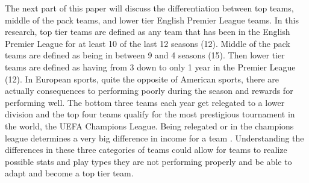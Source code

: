 \documentclass[12pt,english]{article}
\begin{document}
\begin{Introduction}
\begin{doublespace}
\indent The next part of this paper will discuss the differentiation between top teams, middle of the pack teams, and lower tier English Premier League teams. In this research, top tier teams are defined as any team that has been in the English Premier League for at least 10 of the last 12 seasons (12). Middle of the pack teams are defined as being in between 9 and 4 seasons (15). Then lower tier teams are defined as having from 3 down to only 1 year in the Premier League (12). In European sports, quite the opposite of American sports, there are actually consequences to performing poorly during the season and rewards for performing well. The bottom three teams each year get relegated to a lower division and the top four teams qualify for the most prestigious tournament in the world, the UEFA Champions League. Being relegated or in the champions league determines a very big difference in income for a team \citep{oberstone}. Understanding the differences in these three categories of teams could allow for teams to realize possible stats and play types they are not performing properly and be able to adapt and become a top tier team. 
\end{doublespace}
\end{Introduction}
\end{document}
